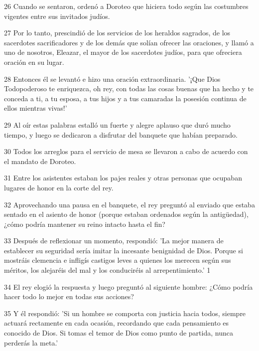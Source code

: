 \par 26 Cuando se sentaron, ordenó a Doroteo que hiciera todo según las costumbres vigentes entre sus invitados judíos.

\par 27 Por lo tanto, prescindió de los servicios de los heraldos sagrados, de los sacerdotes sacrificadores y de los demás que solían ofrecer las oraciones, y llamó a uno de nosotros, Eleazar, el mayor de los sacerdotes judíos, para que ofreciera oración en su lugar.

\par 28 Entonces él se levantó e hizo una oración extraordinaria. '¡Que Dios Todopoderoso te enriquezca, oh rey, con todas las cosas buenas que ha hecho y te conceda a ti, a tu esposa, a tus hijos y a tus camaradas la posesión continua de ellos mientras vivas!'

\par 29 Al oír estas palabras estalló un fuerte y alegre aplauso que duró mucho tiempo, y luego se dedicaron a disfrutar del banquete que habían preparado.

\par 30 Todos los arreglos para el servicio de mesa se llevaron a cabo de acuerdo con el mandato de Doroteo.

\par 31 Entre los asistentes estaban los pajes reales y otras personas que ocupaban lugares de honor en la corte del rey.

\par 32 Aprovechando una pausa en el banquete, el rey preguntó al enviado que estaba sentado en el asiento de honor (porque estaban ordenados según la antigüedad), ¿cómo podría mantener su reino intacto hasta el fin?

\par 33 Después de reflexionar un momento, respondió: 'La mejor manera de establecer su seguridad sería imitar la incesante benignidad de Dios. Porque si mostráis clemencia e infligís castigos leves a quienes los merecen según sus méritos, los alejaréis del mal y los conduciréis al arrepentimiento.' 1

\par 34 El rey elogió la respuesta y luego preguntó al siguiente hombre: ¿Cómo podría hacer todo lo mejor en todas sus acciones?

\par 35 Y él respondió: 'Si un hombre se comporta con justicia hacia todos, siempre actuará rectamente en cada ocasión, recordando que cada pensamiento es conocido de Dios. Si tomas el temor de Dios como punto de partida, nunca perderás la meta.'

